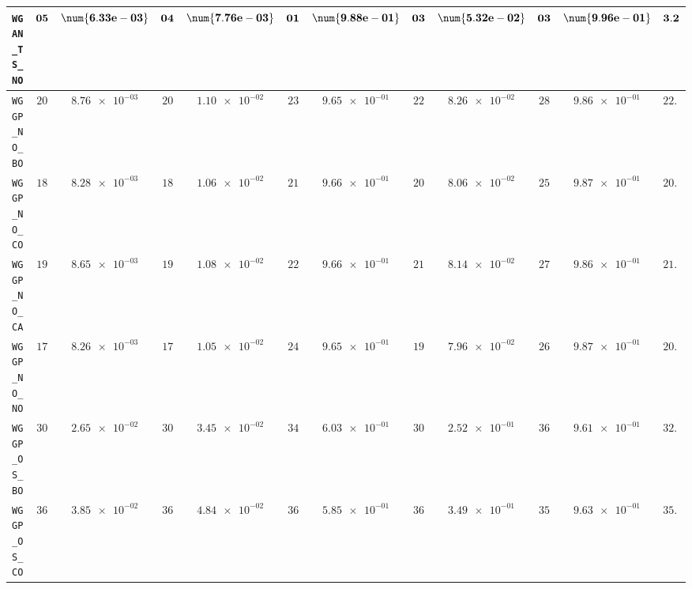 \begin{table}[H]
\begin{tabularx}{\textwidth}{l||cC|cC|cC|cC|cC||c}
		\texttt{WGAN\_TS\_NO} & $\bf 05$ & $\bf \num{6.33e-03}$ & $\bf 04$ & $\bf \num{7.76e-03}$ & $\bf 01$ & $\bf \num{9.88e-01}$ & $\bf 03$ & $\bf \num{5.32e-02}$ & $\bf 03$ & $\bf \num{9.96e-01}$ & $\bf 3.2$  \\ \hline
		\texttt{WGGP\_NO\_BO} & $ 20$ & $ \num{8.76e-03}$ & $ 20$ & $ \num{1.10e-02}$ & $ 23$ & $ \num{9.65e-01}$ & $ 22$ & $ \num{8.26e-02}$ & $ 28$ & $ \num{9.86e-01}$ & $ 22.6$  \\
		\texttt{WGGP\_NO\_CO} & $ 18$ & $ \num{8.28e-03}$ & $ 18$ & $ \num{1.06e-02}$ & $ 21$ & $ \num{9.66e-01}$ & $ 20$ & $ \num{8.06e-02}$ & $ 25$ & $ \num{9.87e-01}$ & $ 20.4$  \\
		\texttt{WGGP\_NO\_CA} & $ 19$ & $ \num{8.65e-03}$ & $ 19$ & $ \num{1.08e-02}$ & $ 22$ & $ \num{9.66e-01}$ & $ 21$ & $ \num{8.14e-02}$ & $ 27$ & $ \num{9.86e-01}$ & $ 21.6$  \\
		\texttt{WGGP\_NO\_NO} & $ 17$ & $ \num{8.26e-03}$ & $ 17$ & $ \num{1.05e-02}$ & $ 24$ & $ \num{9.65e-01}$ & $ 19$ & $ \num{7.96e-02}$ & $ 26$ & $ \num{9.87e-01}$ & $ 20.6$  \\
		\texttt{WGGP\_OS\_BO} & $ 30$ & $ \num{2.65e-02}$ & $ 30$ & $ \num{3.45e-02}$ & $ 34$ & $ \num{6.03e-01}$ & $ 30$ & $ \num{2.52e-01}$ & $ 36$ & $ \num{9.61e-01}$ & $ 32.0$  \\
		\texttt{WGGP\_OS\_CO} & $ 36$ & $ \num{3.85e-02}$ & $ 36$ & $ \num{4.84e-02}$ & $ 36$ & $ \num{5.85e-01}$ & $ 36$ & $ \num{3.49e-01}$ & $ 35$ & $ \num{9.63e-01}$ & $ 35.8$  \\

\end{tabularx}
\end{table}
